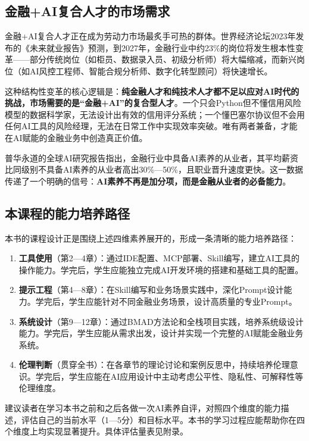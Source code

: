 \subsection{金融+AI复合人才的市场需求}

金融+AI复合人才正在成为劳动力市场最炙手可热的群体。世界经济论坛2023年发布的《未来就业报告》预测，到2027年，金融行业中约23\%的岗位将发生根本性变革——部分传统岗位（如柜员、数据录入员、初级分析师）将大幅缩减，而新兴岗位（如AI风控工程师、智能合规分析师、数字化转型顾问）将快速增长\parencite{wef2023jobs}。

这种结构性变革的核心逻辑是：\textbf{纯金融人才和纯技术人才都不足以应对AI时代的挑战，市场需要的是``金融+AI''的复合型人才}。一个只会Python但不懂信用风险模型的数据科学家，无法设计出有效的信用评分系统；一个懂巴塞尔协议但不会用任何AI工具的风险经理，无法在日常工作中实现效率突破。唯有两者兼备，才能在AI赋能的金融业务中创造真正价值。

普华永道的全球AI研究报告指出，金融行业中具备AI素养的从业者，其平均薪资比同级别不具备AI素养的从业者高出30\%—50\%，且职业晋升速度更快\parencite{pwc2023ai}。这一数据传递了一个明确的信号：\textbf{AI素养不再是加分项，而是金融从业者的必备能力}。

\subsection{本课程的能力培养路径}

本书的课程设计正是围绕上述四维素养展开的，形成一条清晰的能力培养路径：

\begin{enumerate}[leftmargin=2em]
  \item \textbf{工具使用}（第2—4章）：通过IDE配置、MCP部署、Skill编写，建立AI工具的操作能力。学完后，学生应能独立完成AI开发环境的搭建和基础工具的配置。
  \item \textbf{提示工程}（第4—8章）：在Skill编写和业务场景实践中，深化Prompt设计能力。学完后，学生应能针对不同金融业务场景，设计高质量的专业Prompt。
  \item \textbf{系统设计}（第9—12章）：通过BMAD方法论和全栈项目实践，培养系统级设计能力。学完后，学生应能从需求出发，设计并实现一个完整的AI赋能金融业务系统。
  \item \textbf{伦理判断}（贯穿全书）：在各章节的理论讨论和案例反思中，持续培养伦理意识。学完后，学生应能在AI应用设计中主动考虑公平性、隐私性、可解释性等伦理维度。
\end{enumerate}

\begin{notebox}[自我评估建议]
建议读者在学习本书之前和之后各做一次AI素养自评，对照四个维度的能力描述，评估自己的当前水平（1—5分）和目标水平。本书的学习过程应能帮助你在四个维度上均实现显著提升。具体评估量表见附录。
\end{notebox}

